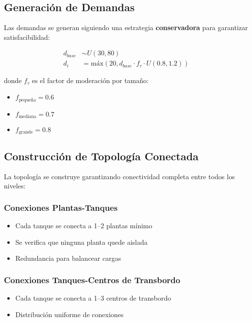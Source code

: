 \documentclass[12pt]{article}
\begin{document}
\subsection{Generación de Demandas}

Las demandas se generan siguiendo una estrategia \textbf{conservadora} para garantizar satisfacibilidad:

\begin{align}
d_{base} &\sim U(30, 80) \\
d_i &= \text{máx}(20, d_{base} \cdot f_\tau \cdot U(0.8, 1.2))
\end{align}

donde $f_\tau$ es el factor de moderación por tamaño:
\begin{itemize}
    \item $f_{\text{pequeña}} = 0.6$
    \item $f_{\text{mediana}} = 0.7$ 
    \item $f_{\text{grande}} = 0.8$
\end{itemize}

\subsection{Construcción de Topología Conectada}

La topología se construye garantizando conectividad completa entre todos los niveles:

\subsubsection{Conexiones Plantas-Tanques}
\begin{itemize}[leftmargin=*]
    \item Cada tanque se conecta a 1--2 plantas mínimo
    \item Se verifica que ninguna planta quede aislada
    \item Redundancia para balancear cargas
\end{itemize}

\subsubsection{Conexiones Tanques-Centros de Transbordo}
\begin{itemize}[leftmargin=*]
    \item Cada tanque se conecta a 1--3 centros de transbordo
    \item Distribución uniforme de conexiones
\end{itemize}
\end{document}
